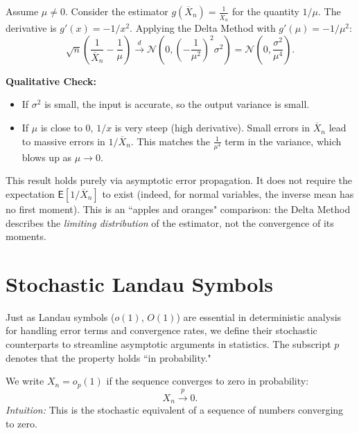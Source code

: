 \begin{ex}
Assume $\mu \neq 0$. Consider the estimator $g(\overline{X}_n) = \frac{1}{\overline{X}_n}$ for the quantity $1/\mu$.
The derivative is $g'(x) = -1/x^2$. Applying the Delta Method with $g'(\mu) = -1/\mu^2$:
\[ \sqrt{n}\left(\frac{1}{\overline{X}_n} - \frac{1}{\mu}\right) \stackrel{d}{\longrightarrow} \mathcal{N}\left(0, \left(-\frac{1}{\mu^2}\right)^2 \sigma^2\right) = \mathcal{N}\left(0, \frac{\sigma^2}{\mu^4}\right). \]

\textbf{Qualitative Check:}
\begin{itemize}
    \item If $\sigma^2$ is small, the input is accurate, so the output variance is small.
    \item If $\mu$ is close to 0, $1/x$ is very steep (high derivative). Small errors in $\overline{X}_n$ lead to massive errors in $1/\overline{X}_n$. This matches the $\frac{1}{\mu^4}$ term in the variance, which blows up as $\mu \to 0$.
\end{itemize}

\begin{note}
This result holds purely via asymptotic error propagation. It does not require the expectation $\mathsf{E}[1/\overline{X}_n]$ to exist (indeed, for normal variables, the inverse mean has no first moment). This is an ``apples and oranges" comparison: the Delta Method describes the \textit{limiting distribution} of the estimator, not the convergence of its moments.
\end{note}
\end{ex}

\section{Stochastic Landau Symbols}

Just as Landau symbols ($o(1)$, $O(1)$) are essential in deterministic analysis for handling error terms and convergence rates, we define their stochastic counterparts to streamline asymptotic arguments in statistics. The subscript $p$ denotes that the property holds ``in probability."

\begin{definition}
We write $X_n = o_p(1)$ if the sequence converges to zero in probability:
\[ X_n \xrightarrow{p} 0. \]
\textit{Intuition:} This is the stochastic equivalent of a sequence of numbers converging to zero.
\end{definition}

